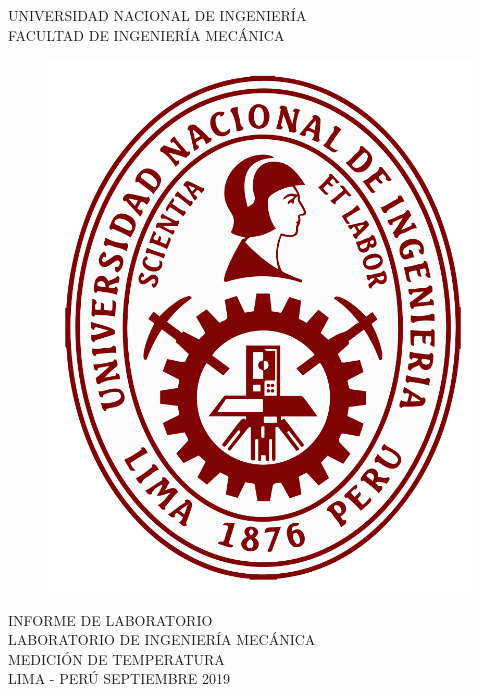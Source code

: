 \documentclass[a4paper,11pt]{report}
\begin{document}
\setcounter{page}{1}
\thispagestyle{empty}
\begin{center}
{\huge UNIVERSIDAD NACIONAL DE INGENIERÍA}\\[0.9cm]
{\Large FACULTAD DE INGENIERÍA MECÁNICA}\\[0.6in]
\end{center}
\begin{figure}[h]
\begin{center}
\includegraphics[scale=0.33]{logoUNI.png}
\vspace{0cm}
\end{center}
\end{figure}
\vspace{0.5cm}
\begin{center}
INFORME DE LABORATORIO\\
LABORATORIO DE INGENIERÍA MECÁNICA\\[14mm]
{\large MEDICIÓN DE TEMPERATURA}\\[10mm]
\vfill
LIMA - PERÚ \hfill SEPTIEMBRE 2019
\end{center}
\end{document}
